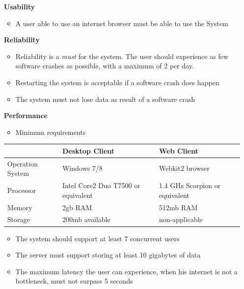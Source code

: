 \begin{itemize}

\item[\textbf{Usability}]
\begin{itemize}
\item A user able to use an internet browser must be able to use the System
\end{itemize}

\vspace{0.2cm}
\item[\textbf{Reliability}]
\begin{itemize}
\item Reliability is a \textit{must} for the system. The user should experience as few software crashes as possible, with a maximum of 2 per day.
\item Restarting the system is acceptable if a software crash does happen
\item The system must not lose data as result of a software crash
\end{itemize}


\vspace{0.2cm}
\item[\textbf{Performance}] 

\hspace{50cm}

\begin{itemize}
\item Minimum requirements
\end{itemize}


\begin{tabular}{|p{2cm}|p{5cm}|p{5cm}|}
\hline  & Desktop Client & Web Client \\ 
\hline Operation System & Windows 7/8 & Webkit2 browser \\
\hline Processor & Intel Core2 Duo T7500 or equivalent & 1.4 GHz Scorpion or equivalent \\ 
\hline Memory & 2gb RAM & 512mb RAM \\ 
\hline Storage & 200mb available & non-applicable \\ 
\hline 
\end{tabular} 

\vspace{0.2cm}

\begin{itemize}
\item The system should support at least 7 concurrent users
\item The server must support storing at least 10 gigabytes of data
\item The maximum latency the user can experience, when his internet is not a bottleneck, must not surpass 5 seconds
\end{itemize}


\end{itemize}
